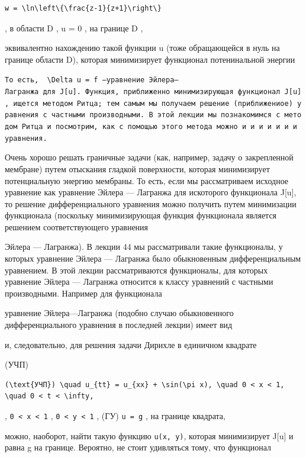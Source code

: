 \documentclass[
  ukrainian,
]{article}
\begin{document}
\begin{verbatim}
w = \ln\left\{\frac{z-1}{z+1}\right\}
\end{verbatim}

, в области D , u = 0 , на границе D ,

эквивалентно нахождению такой функции u (тоже обращающейся в нуль на
границе области D), которая минимизирует функционал потенинальной
энергии

\texttt{То\ есть,\ \ \textquotesingle{}\textbackslash{}Delta\ u\ =\ f\textquotesingle{}\ —уравнение\ Эйлера—Лагранжа\ для\ J{[}u{]}.\ Функция,\ приближенно\ минимизирующая\ функционал\ J{[}u{]},\ ищется\ методом\ Ритца;\ тем\ самым\ мы\ получаем\ решение\ (приближениое)\ уравнения\ с\ частными\ производными.\ В\ этой\ лекции\ мы\ познакомимся\ с\ методом\ Ритца\ и\ посмотрим,\ как\ с\ помощью\ этого\ метода\ можно\ и\ и\ и\ и\ и\ и\ и\ уравнения.}

Очень хорошо решать граничные задачи (как, например, задачу о
закрепленной мембране) путем отыскания гладкой поверхности, которая
минимизирует потенциальную энергию мембраны. То есть, если мы
рассматриваем исходное уравнение как уравнение Эйлера --- Лагранжа для
искоторого функционала J{[}u{]}, то решение дифференциального уравнения
можно получить путем минимизации функционала (поскольку минимизирующая
функция функционала является решением соответствующего уравнения

Эйлера --- Лагранжа). В лекции 44 мы рассматривали такие функционалы, у
которых уравнение Эйлера --- Лагранжа было обыкновенным дифференциальным
уравнением. В этой лекции рассматриваются функционалы, для которых
уравнение Эйлера --- Лагранжа относится к классу уравнений с частными
производными. Например для функционала

уравнение Эйлера---Лагранжа (подобно случаю обыкновенного
дифференциального уравнения в последней лекции) имеет вид

и, следовательно, для решения задачи Дирихле в единичном квадрате

(УЧП)

\begin{verbatim}
(\text{УЧП}) \quad u_{tt} = u_{xx} + \sin(\pi x), \quad 0 < x < 1, \quad 0 < t < \infty,
\end{verbatim}

, \texttt{0\ \textless{}\ x\ \textless{}\ 1} ,
\texttt{0\ \textless{}\ y\ \textless{}\ 1} , (ГУ) \texttt{u\ =\ g} , на
границе квадрата,

можно, наоборот, найти такую функцию \texttt{u(x,\ y)}, которая
минимизирует J{[}u{]} и равна g на границе. Вероятно, не стоит
удивляться тому, что функционал
\end{document}
